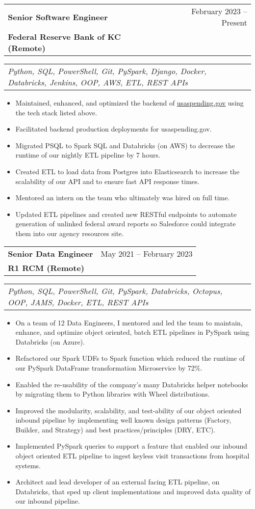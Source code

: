 \documentclass[letterpaper,11pt]{article}
\makeatletter
\newcommand{\resumeItem}[1]{
  \item\small{
    {#1 \vspace{1pt}}
  }
}
\newcommand{\resumeExperienceSubheading}[4]{
  \vspace{9pt}\item
    \begin{tabular*}{0.97\textwidth}[t]{l@{\extracolsep{\fill}}r}
      \textbf{#1} & #2 \\
      \textbf{#3} & \textit{\small #4} \\
    \end{tabular*}\vspace{2pt}
}
\newcommand{\resumeSubSubheading}[1]{
    \vspace{-15pt}\item
    \begin{tabular*}{0.97\textwidth}{l@{\extracolsep{\fill}}r}
      \textit{#1} \\
    \end{tabular*}\vspace{2pt}
}
\newcommand{\resumeItemListStart}{\begin{itemize}}
\newcommand{\resumeItemListEnd}{\end{itemize}\vspace{-5pt}}
\makeatother
\begin{document}
    \resumeExperienceSubheading
      {Senior Software Engineer}{February 2023 -- Present}
      {Federal Reserve Bank of KC (Remote)}{}
    \resumeSubSubheading
        {Python, SQL, PowerShell, Git, PySpark, Django, Docker, Databricks, Jenkins, OOP, AWS, ETL, REST APIs}{}
      \resumeItemListStart
        \resumeItem{Maintained, enhanced, and optimized the backend of \href{https://www.usaspending.gov/} {\underline{usaspending.gov}} using the tech stack listed above.}
        \resumeItem{Facilitated backend production deployments for usaspending.gov.}
        \resumeItem{Migrated PSQL to Spark SQL and Databricks (on AWS) to decrease the runtime of our nightly ETL pipeline by 7 hours.}
        \resumeItem{Created ETL to load data from Postgres into Elasticsearch to increase the scalability of our API and to ensure fast API response times.}
        \resumeItem{Mentored an intern on the team who ultimately was hired on full time.}
        \resumeItem{Updated ETL pipelines and created new RESTful endpoints to automate generation of unlinked federal award reports so Salesforce could integrate them into our agency resources site.}
      \resumeItemListEnd
      


    \resumeExperienceSubheading
          {Senior Data Engineer}{May 2021 -- February 2023}
          {R1 RCM (Remote)}{}
      \resumeSubSubheading
        {Python, SQL, PowerShell, Git, PySpark, Databricks, Octopus, OOP, JAMS, Docker, ETL, REST APIs}{}
      \resumeItemListStart
        \resumeItem{On a team of 12 Data Engineers, I mentored and led the team to maintain, enhance, and optimize object oriented, batch ETL pipelines in PySpark using Databricks (on Azure).}
        \resumeItem{Refactored our Spark UDFs to Spark function which reduced the runtime of our PySpark DataFrame transformation Microservice by 72\%.}
        \resumeItem{Enabled the re-usability of the company's many Databricks helper notebooks by migrating them to Python libraries with Wheel distributions.}
        \resumeItem{Improved the modularity, scalability, and test-ability of our object oriented inbound pipeline by implementing well known design patterns (Factory, Builder, and Strategy) and best practices/principles (DRY, ETC).}
        \resumeItem{Implemented PySpark queries to support a feature that enabled our inbound object oriented ETL pipeline to ingest keyless visit transactions from hospital systems.}
        \resumeItem{Architect and lead developer of an external facing ETL pipeline, on Databricks, that sped up client implementations and improved data quality of our inbound pipeline.}
        \newline
        \newline
        \newline
    \resumeItemListEnd
\end{document}
